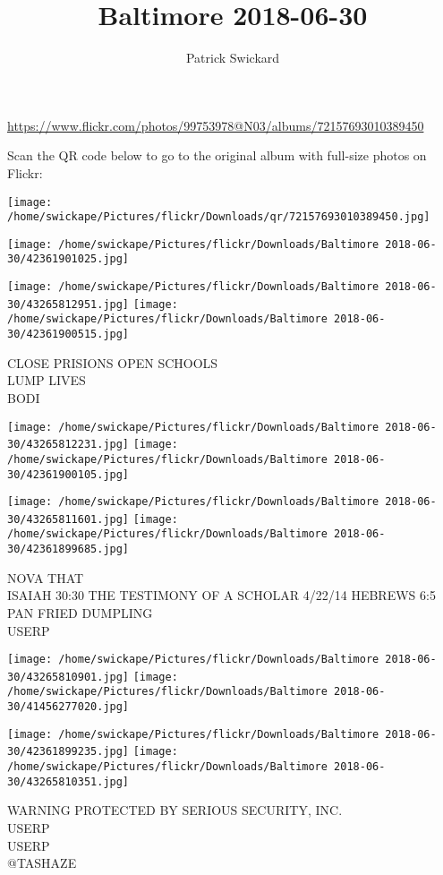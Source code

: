 \documentclass[10pt,letterpaper]{article}
\title{Baltimore 2018-06-30}
\author{Patrick Swickard}
\date{}
\begin{document}
\maketitle

\url{https://www.flickr.com/photos/99753978@N03/albums/72157693010389450}

Scan the QR code below to go to the original album with full-size photos on Flickr:

\texttt{[image: /home/swickape/Pictures/flickr/Downloads/qr/72157693010389450.jpg]}
\pagebreak

\texttt{[image: /home/swickape/Pictures/flickr/Downloads/Baltimore 2018-06-30/42361901025.jpg]}

\vspace{0.25in}
\texttt{[image: /home/swickape/Pictures/flickr/Downloads/Baltimore 2018-06-30/43265812951.jpg]}
\texttt{[image: /home/swickape/Pictures/flickr/Downloads/Baltimore 2018-06-30/42361900515.jpg]}

CLOSE PRISIONS OPEN SCHOOLS\\
LUMP LIVES\\
BODI
\pagebreak

\texttt{[image: /home/swickape/Pictures/flickr/Downloads/Baltimore 2018-06-30/43265812231.jpg]}
\texttt{[image: /home/swickape/Pictures/flickr/Downloads/Baltimore 2018-06-30/42361900105.jpg]}

\texttt{[image: /home/swickape/Pictures/flickr/Downloads/Baltimore 2018-06-30/43265811601.jpg]}
\texttt{[image: /home/swickape/Pictures/flickr/Downloads/Baltimore 2018-06-30/42361899685.jpg]}

NOVA THAT\\
ISAIAH 30:30 THE TESTIMONY OF A SCHOLAR 4/22/14 HEBREWS 6:5\\
PAN FRIED DUMPLING\\
USERP
\pagebreak

\texttt{[image: /home/swickape/Pictures/flickr/Downloads/Baltimore 2018-06-30/43265810901.jpg]}
\texttt{[image: /home/swickape/Pictures/flickr/Downloads/Baltimore 2018-06-30/41456277020.jpg]}

\texttt{[image: /home/swickape/Pictures/flickr/Downloads/Baltimore 2018-06-30/42361899235.jpg]}
\texttt{[image: /home/swickape/Pictures/flickr/Downloads/Baltimore 2018-06-30/43265810351.jpg]}

WARNING PROTECTED BY SERIOUS SECURITY, INC.\\
USERP\\
USERP\\
@TASHAZE
\pagebreak
\end{document}
